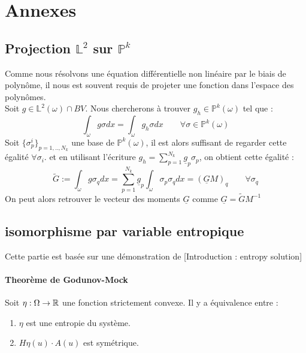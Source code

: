 \newpage
\section{Annexes}
\subsection{Projection $\mathbb{L}^2$ sur $ \mathbb{P}^k$ }\label{projection}
Comme nous résolvons une équation différentielle non linéaire par le biais de polynôme, 
il nous est souvent requis de projeter une fonction dans l'espace des polynômes.\\

Soit $g \in \mathbb{L}^2(\omega) \cap BV$. Nous chercherons à trouver $g_h \in \mathbb{P}^k(\omega)$ tel que : 
\begin{equation}
    \int_\omega g \sigma dx = \int_\omega g_h \sigma dx\qquad \forall \sigma \in \mathbb{P}^k(\omega)
\end{equation}
Soit $\{\sigma_p^i\}_{p=1,..,N_k}$ une base de $\mathbb{P}^k(\omega)$, il est alors suffisant de regarder cette égalité $\forall \sigma_i$.
et en utilisant l'écriture $g_h = \sum_{p=1}^{N_k} \underline{g}_p \sigma_p$, on obtient cette égalité : 
\begin{equation}
    \tilde{G} :=\int_\omega g \sigma_q dx = \sum_{p=1}^{N_k} \underline{g}_p \int_\omega \sigma_p\sigma_q dx = (\underline{G} M)_q \qquad \forall \sigma_q 
\end{equation}
On peut alors retrouver le vecteur des moments $\underline{G}$ comme $\underline{G} =\tilde{G} M^{-1}$

\subsection{isomorphisme par variable entropique \label{entropie_Annexes}}

Cette partie est basée sur une démonstration de \cite{godlewski2021numerical} [Introduction : entropy solution]
\paragraph{Theorème de Godunov-Mock}
Soit $\eta :\Omega \to \mathbb{R}$ une fonction strictement convexe. Il y a équivalence entre :
\begin{enumerate}
    \item $\eta$ est une entropie du système.
    \item $H\eta(u)\cdot A(u)$ est symétrique.
\end{enumerate}
